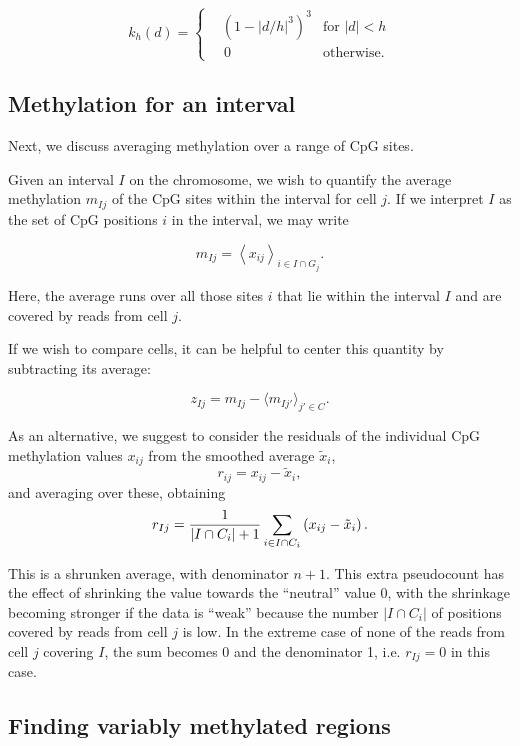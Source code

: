 \documentclass[twocolumn,10pt]{article}
\begin{document}
\[ k_h(d) = \left\{
\begin{aligned}
    &\left(1-|d/h|^3\right)^3 &\text{for } |d|<h \\
    &\,0 &\text{otherwise}.
\end{aligned}
\right.
\]

\subsection{Methylation for an interval}

Next, we discuss averaging methylation over a range of CpG sites.

Given an interval $I$ on the chromosome, we wish to quantify the average methylation $m_{Ij}$ of the CpG sites within the interval for cell $j$.
If we interpret $I$ as the set of CpG positions $i$ in the interval, we may write

$$ m_{Ij} = \left< x_{ij} \right>_{i\in I\cap G_j}.$$

Here, the average runs over all those sites $i$ that lie within the interval $I$ and are covered by reads from cell $j$.

If we wish to compare cells, it can be helpful to center this quantity by subtracting its average:

$$ z_{Ij} = m_{Ij} - \langle m_{Ij'}\rangle_{j'\in C}.$$

As an alternative, we suggest to consider the residuals of the individual CpG methylation values $x_{ij}$ from the smoothed average $\tilde x_i$,
$$ r_{ij} = x_{ij} - \tilde x_i, $$
and averaging over these, obtaining
\begin{equation} 
r_{Ij} = \frac{\scriptsize{1}}{\scriptsize{|I\cap C_i|+1}}\sum_{i\in I\cap C_i}\left( x_{ij} - \tilde x_i \right).
\label{avgres}
\end{equation}

This is a shrunken average, with denominator $n+1$.
This extra pseudocount has the effect of shrinking the value towards the ``neutral'' value 0, with the shrinkage becoming stronger if the data is ``weak'' because the number $|I\cap C_i|$ of positions covered by reads from cell $j$  is low.
In the extreme case of none of the reads from cell $j$ covering $I$, the sum becomes 0 and the denominator 1, i.e.
$r_{Ij}=0$ in this case.

\subsection{Finding variably methylated regions}
\end{document}
